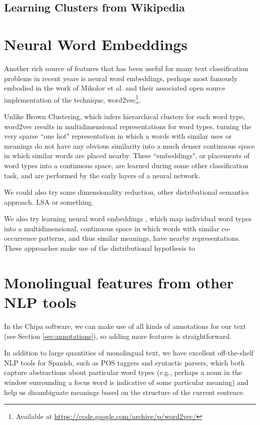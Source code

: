 \subsection{Learning Clusters from Wikipedia}


\section{Neural Word Embeddings}
Another rich source of features that has been useful for many text
classification problems in recent years is neural word embeddings, perhaps most
famously embodied in the work of Mikolov et al. \cite{mikolovword2vec} and
their associated open source implementation of the technique,
word2vec\footnote{Available at
\url{https://code.google.com/archive/p/word2vec/}}.

Unlike Brown Clustering, which infers hierarchical clusters for each word type,
word2vec results in multidimensional representations for word types, turning
the very sparse ``one hot" representation in which a words with similar uses or
meanings do not have any obvious similarity into a much denser continuous space
in which similar words are placed nearby. These ``embeddings", or placements of
word types into a continuous space, are learned during some other
classification task, and are performed by the early layers of a neural network.

We could also try some dimensionality reduction, other distributional semantics
approach. LSA or something.


We also try learning neural word embeddings \cite{mikolovword2vec}, which map
individual word types into a multidimensional, continuous space in which words
with similar co-occurrence patterns, and thus similar meanings, have nearby
representations.  These approaches make use of the distributional hypothesis to 

\section{Monolingual features from other NLP tools}
In the Chipa software, we can make use of all kinds of annotations for our
text (see Section \ref{sec:annotations}), so adding more features is
straightforward.


In addition to large quantities of monolingual text, we have excellent
off-the-shelf NLP tools for Spanish, such as POS taggers and syntactic parsers,
which both capture abstractions about particular word types (e.g., perhaps a
noun in the window surrounding a focus word is indicative of some particular
meaning) and help us disambiguate meanings based on the structure of the
current sentence.


